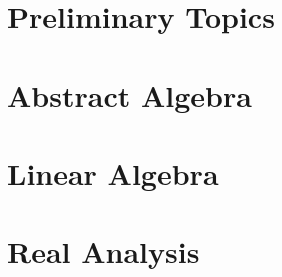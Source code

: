 \documentclass[11pt,a4paper,oneside]{book}
\newif\ifprelim
\newif\ifcalc
\newif\iflinalg
\newif\ifabsalg
\newif\ifranalysis
\newif\ifcanalysis
\newif\iftop
\newif\ifgraph
\begin{document}
\prelimtrue %
\absalgtrue %
\linalgtrue %
\ranalysistrue %



\mainmatter
\ifprelim
    \part{Preliminary Topics}\label{part:prelim}
    
    
\fi

\ifcalc
    \part{Calculus}
    
    
\fi

\ifabsalg
    \part{Abstract Algebra}\label{part:abstract-algebra}
    
%    
%    
%    
\fi

\iflinalg
    \part{Linear Algebra}\label{part:linear-algebra}
    
    
    
    
\fi

\ifranalysis
    \part{Real Analysis}\label{part:real-analysis}
    
    
    
%    
%    
%    
%    
%    
\fi
\end{document}
